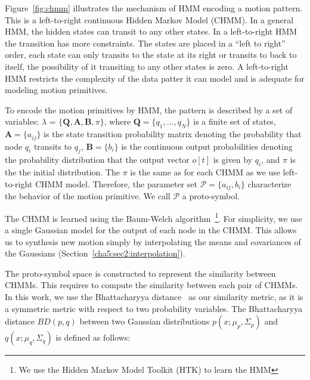 Figure~\ref{fig:chmm} illustrates the mechanism of HMM encoding a motion pattern. This is a left-to-right continuous Hidden Markov Model (CHMM). In a general HMM, the hidden states can transit to any other states. In a left-to-right HMM the transition has more constraints. The states are placed in a ``left to right'' order, each state can only transits to the state at its right or transits to back to itself, the possibility of it transiting to any other states is zero. A left-to-right HMM restricts the complexity of the data patter it can model and is adequate for modeling motion primitives.

To encode the motion primitives by HMM, the pattern is described by a set of variables: $\lambda$ = $\{\boldsymbol{Q},\boldsymbol{A},\boldsymbol{B},\pi\}$, where $\boldsymbol{Q}=\{q_1, ..., q_N\}$ is a finite set of states, $\boldsymbol{A}=\{a_{ij}\}$ is the state transition probability matrix denoting the probability that node $q_i$ transits to $q_j$, $\boldsymbol{B}=\{b_{i}\}$ is the continuous output probabilities denoting the probability distribution that the output vector $o[t]$ is given by $q_i$, and $\pi$ is the the initial distribution. The $\pi$ is the same as for each CHMM as we use left-to-right CHMM model. Therefore, the parameter set $\mathcal{P} = \{a_{ij},b_i\}$ characterize the behavior of the motion primitive. We call $\mathcal{P}$ a proto-symbol.

The CHMM is learned using the Baum-Welch algorithm~\citep{rabiner1989tutorial}\footnote{We use the Hidden Markov Model Toolkit (HTK) to learn the HMM}.
For simplicity, we use a single Gaussian model for the output of each node in the CHMM. This allows us to synthesis new motion simply by interpolating the means and covariances of the Gaussians (Section~\ref{cha5:sec2:interpolation}).

The proto-symbol space is constructed to represent the similarity between CHMMs. This requires to compute the similarity between each pair of CHMMs. In this work, we use the Bhattacharyya distance~\citep{kailath1967divergence} as our similarity metric, as it is a symmetric metric with respect to two probability variables. The Bhattacharyya distance $BD(p,q)$ between two Gaussian distributions $p(x;\mu_p,\Sigma_p)$ and $q(x;\mu_q,\Sigma_q)$ is defined as follows:


